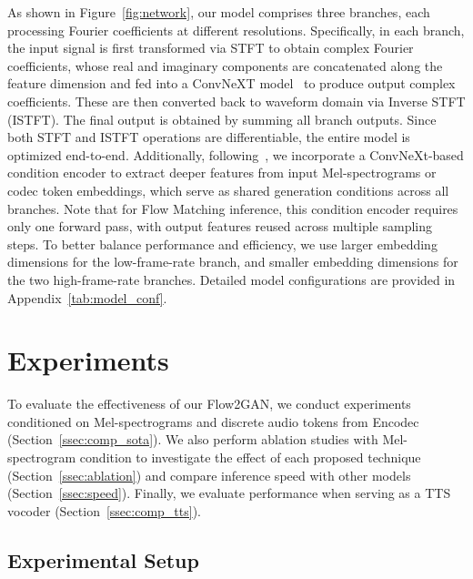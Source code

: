 \documentclass{article} %
\newcommand{\yao}[1]{\textcolor[rgb]{0,0,1} {#1}}
\begin{document}
As shown in Figure~\ref{fig:network}, our model comprises three branches, each processing Fourier coefficients at different resolutions. Specifically, in each branch, the input signal is first transformed via STFT to obtain complex Fourier coefficients, whose real and imaginary components are concatenated along the feature dimension and fed into a ConvNeXT model~\citep{convnext} to produce output complex coefficients. These are then converted back to waveform domain via Inverse STFT (ISTFT). The final output is obtained by summing all branch outputs. Since both STFT and ISTFT operations are differentiable, the entire model is optimized end-to-end. Additionally, following~\citep{periodwave}, we incorporate a ConvNeXt-based condition encoder to extract deeper features from input Mel-spectrograms or codec token embeddings, which serve as shared generation conditions across all branches. Note that for Flow Matching inference, this condition encoder requires only one forward pass, with output features reused across multiple sampling steps. To better balance performance and efficiency, we use larger embedding dimensions for the low-frame-rate branch, and smaller embedding dimensions for the two high-frame-rate branches. Detailed model configurations are provided in Appendix~\ref{tab:model_conf}.  











\vspace{-0.6em}
\section{Experiments}
\vspace{-0.8em}

To evaluate the effectiveness of our Flow2GAN, we conduct experiments conditioned on Mel-spectrograms and discrete audio tokens from Encodec~\citep{encodec} (Section~\ref{ssec:comp_sota}). We also perform ablation studies with Mel-spectrogram condition to investigate the effect of each proposed technique (Section~\ref{ssec:ablation}) and compare inference speed with other models (Section~\ref{ssec:speed}). Finally, we evaluate performance when serving as a TTS vocoder (Section~\ref{ssec:comp_tts}). 

\vspace{-0.5em}
\subsection{Experimental Setup} 
\label{ssec:exp_setup}
\vspace{-0.5em}
\end{document}
